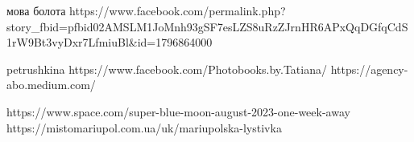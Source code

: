 мова болота
https://www.facebook.com/permalink.php?story_fbid=pfbid02AMSLM1JoMnh93gSF7esLZS8uRzZJrnHR6APxQqDGfqCdS1rW9Bt3vyDxr7LfmiuBl&id=1796864000

petrushkina
https://www.facebook.com/Photobooks.by.Tatiana/
https://agency-abo.medium.com/%

https://www.space.com/super-blue-moon-august-2023-one-week-away
https://mistomariupol.com.ua/uk/mariupolska-lystivka


